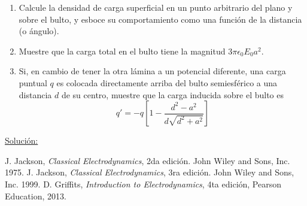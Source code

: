 \documentclass[a4paper,10pt]{article}
\numberwithin{equation}{section}
\begin{document}
\begin{enumerate}[label=\textbf{(\alph*)}]
 \item Calcule la densidad de carga superficial en un punto arbitrario del 
 plano y sobre el bulto, y esboce su comportamiento como una función de la distancia 
 (o ángulo).
 \item Muestre que la carga total en el bulto tiene la magnitud $3\pi\epsilon_0E_0a^2$.
 \item Si, en cambio de tener la otra lámina a un potencial diferente, una carga 
 puntual $q$ es colocada directamente arriba del bulto semiesférico a una distancia 
 $d$ de su centro, muestre que la carga inducida sobre el bulto es 
 $$
 q' = -q\left[1 - \frac{d^2 - a^2}{d\sqrt{d^2 + a^2}} \right]
 $$
\end{enumerate}

\vspace{.3cm}

\underline{Solución:} \vspace{.3cm}

\begin{thebibliography}{10}
J. Jackson, \emph{Classical Electrodynamics}, 2da edición. John Wiley and Sons, Inc. 
1975.
J. Jackson, \emph{Classical Electrodynamics}, 3ra edición. John Wiley and Sons, Inc. 
1999.
D. Griffits, \emph{Introduction to Electrodynamics}, 4ta edición, Pearson Education, 
2013.
\end{thebibliography}
\end{document}
